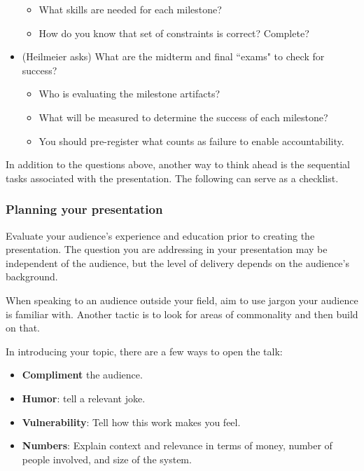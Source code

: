 \begin{itemize}
\begin{itemize}
        \item What skills are needed for each milestone?
        \item How do you know that set of constraints is correct? Complete?
    \end{itemize}
    \item (Heilmeier asks) What are the midterm and final ``exams" to check for success?
    \begin{itemize}
        \item Who is evaluating the milestone artifacts?
        \item What will be measured to determine the success of each milestone?
        \item You should pre-register what counts as failure to enable accountability.
    \end{itemize}
\end{itemize}








In addition to the questions above, another way to think ahead is the sequential tasks associated with the presentation. 
The following can serve as a checklist.

\subsubsection*{Planning your presentation}

Evaluate your audience's experience and education prior to creating the presentation. The question you are addressing in your presentation may be independent of the audience, but the level of delivery depends on the audience's background.

When speaking to an audience outside your field, aim to use jargon your audience is familiar with. Another tactic is to look for areas of commonality and then build on that.

In introducing your topic, there are a few ways to open the talk:
\begin{itemize}
    \item \textbf{Compliment} the audience.
    \item \textbf{Humor}: tell a relevant joke.
    \item \textbf{Vulnerability}: Tell how this work makes you feel.
    \item \textbf{Numbers}: Explain context and relevance in terms of money, number of people involved, and size of the system.
\end{itemize}



